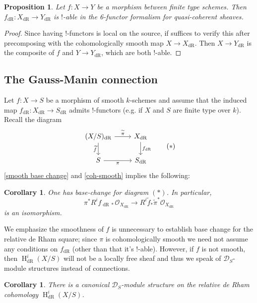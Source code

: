\documentclass{article}
\newtheorem{proposition}[theorem]{Proposition}
\newtheorem{corollary}[theorem]{Corollary}
\theoremstyle{definition}
\theoremstyle{remark}
\newcommand{\scr}[1]{\mathscr{#1}}
\DeclareMathOperator{\dr}{dR}
\DeclareMathOperator{\h}{H}
\begin{document}
\begin{proposition}
Let $f: X \to Y$ be a morphism between finite type schemes. Then $f_{\dr}: X_{\dr} \to Y_{\dr}$ is $!$-able in the 6-functor formalism for quasi-coherent sheaves.
\end{proposition}

\begin{proof}
Since having $!$-functors is local on the source, if suffices to verify this after precomposing with the cohomologically smooth map $X \to X_{\dr}$. Then $X \to Y_{\dr}$ is the composite of $f$ and $Y \to Y_{\dr}$, which are both $!$-able.
\end{proof}

\subsection{The Gauss-Manin connection}

Let $f: X \to S$ be a morphism of smooth $k$-schemes and assume that the induced map $f_{\dr}: X_{\dr} \to S_{\dr}$ admits $!$-functors (e.g. if $X$ and $S$ are finite type over $k$). Recall the diagram
\[\begin{tikzcd}
  {(X/S)_{\dr}} & {X_{\dr}} \\
  S & {S_{\dr}}
  \arrow["{\widetilde{\pi}}", from=1-1, to=1-2]
  \arrow["{\widetilde{f}}"', from=1-1, to=2-1]
  \arrow["\pi"', from=2-1, to=2-2]
  \arrow["{f_{\dr}}", from=1-2, to=2-2]
\end{tikzcd}\tag{$\ast$}\]
\ref{smooth base change} and \ref{coh-smooth} implies the following:

\begin{corollary} One has base-change for diagram $(*)$. In particular,
$$ \pi^*R^i f_{\dr *} \scr{O}_{X_{\dr}} \to R^i\widetilde{f}_* \widetilde{\pi}^* \scr{O}_{X_{\dr}}$$
is an isomorphism.
\end{corollary}


We emphasize the smoothness of $f$ is unnecessary to establish base change for the relative de Rham square; since $\pi$ is cohomologically smooth we need not assume any conditions on $f_{\dr}$ (other than that it's $!$-able). However, if $f$ is not smooth, then $\h^i_{\dr}(X/S)$ will not be a locally free sheaf and thus we speak of $\scr{D}_S$-module structures instead of connections.

\begin{corollary} There is a canonical $\scr{D}_S$-module structure on the relative de Rham cohomology $\h_{\dr}^i(X/S)$.
\end{corollary}
\end{document}
